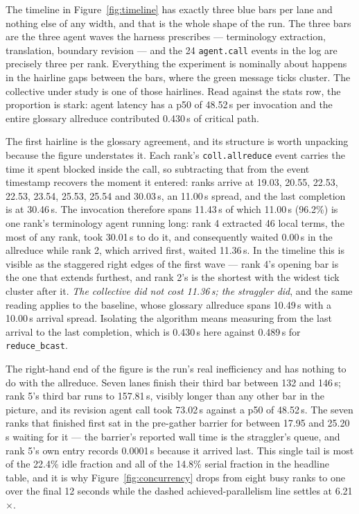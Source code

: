 \documentclass[11pt]{article}
\begin{document}
The timeline in Figure~\ref{fig:timeline} has exactly three blue bars per lane and nothing else of
any width, and that is the whole shape of the run. The three bars are the three agent waves the
harness prescribes --- terminology extraction, translation, boundary revision --- and the 24
\texttt{agent.call} events in the log are precisely three per rank. Everything the experiment is
nominally about happens in the hairline gaps between the bars, where the green message ticks
cluster. The collective under study is one of those hairlines. Read against the stats row, the
proportion is stark: agent latency has a p50 of 48.52\,s per invocation and the entire glossary
allreduce contributed 0.430\,s of critical path.

The first hairline is the glossary agreement, and its structure is worth unpacking because the
figure understates it. Each rank's \texttt{coll.allreduce} event carries the time it spent blocked
inside the call, so subtracting that from the event timestamp recovers the moment it entered:
ranks arrive at 19.03, 20.55, 22.53, 22.53, 23.54, 25.53, 25.54 and 30.03\,s, an 11.00\,s spread,
and the last completion is at 30.46\,s. The invocation therefore spans 11.43\,s of which 11.00\,s
(96.2\%) is one rank's terminology agent running long: rank 4 extracted 46 local terms, the most of
any rank, took 30.01\,s to do it, and consequently waited 0.00\,s in the allreduce while rank 2,
which arrived first, waited 11.36\,s. In the timeline this is visible as the staggered right edges
of the first wave --- rank 4's opening bar is the one that extends furthest, and rank 2's is the
shortest with the widest tick cluster after it. \emph{The collective did not cost 11.36\,s; the
straggler did}, and the same reading applies to the baseline, whose glossary allreduce spans
10.49\,s with a 10.00\,s arrival spread. Isolating the algorithm means measuring from the last
arrival to the last completion, which is 0.430\,s here against 0.489\,s for \texttt{reduce\_bcast}.

The right-hand end of the figure is the run's real inefficiency and has nothing to do with the
allreduce. Seven lanes finish their third bar between 132 and 146\,s; rank 5's third bar runs to
157.81\,s, visibly longer than any other bar in the picture, and its revision agent call took
73.02\,s against a p50 of 48.52\,s. The seven ranks that finished first sat in the pre-gather
barrier for between 17.95 and 25.20\,s waiting for it --- the barrier's reported wall time is the
straggler's queue, and rank 5's own entry records 0.0001\,s because it arrived last. This single
tail is most of the 22.4\% idle fraction and all of the 14.8\% serial fraction in the headline
table, and it is why Figure~\ref{fig:concurrency} drops from eight busy ranks to one over the
final 12 seconds while the dashed achieved-parallelism line settles at 6.21$\times$.
\end{document}
